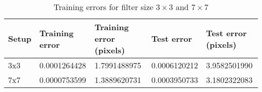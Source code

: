 \begin{table}[h!]
\centering
\footnotesize
\begin{tabular}{|l|l|l|l|l|}
	\hline
		\textbf{Setup} & \textbf{Training error} & \textbf{Training error (pixels)} & \textbf{Test error} & \textbf{Test error (pixels)}\\
	\hline
		3x3 & 0.0001264428%
			& 1.7991488975%
			& 0.0006120212%
			& 3.9582501990%
			\\
	\hline
		7x7	& 0.0000753599%
			& 1.3889620731%
			& 0.0003950733%
			& 3.1802322083%
			\\
	\hline
	\end{tabular}
	\normalsize
	\caption{Training errors for filter size $3\times3$ and $7\times7$}
	\label{tab:gabor_errors_3x3_vs_7x7}
\end{table}
